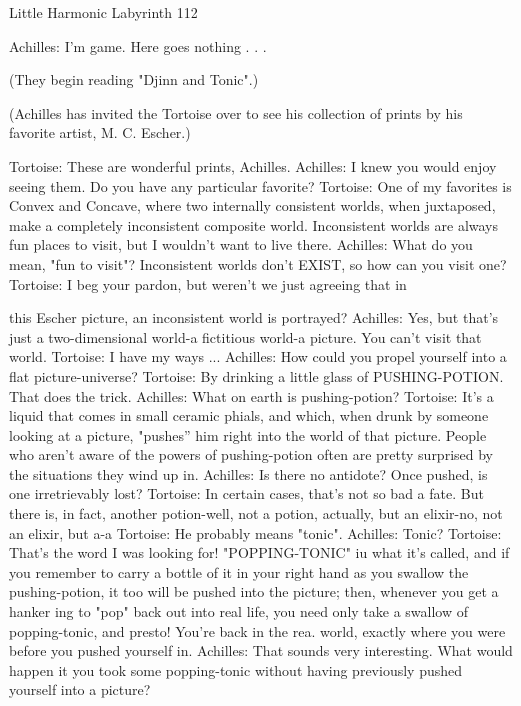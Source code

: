 Little Harmonic Labyrinth                                                               112

Achilles: I’m game. Here goes nothing . . .

       (They begin reading "Djinn and Tonic".)

                 (Achilles has invited the Tortoise over to see his collection of prints by
                 his favorite artist, M. C. Escher.)

           Tortoise: These are wonderful prints, Achilles.
           Achilles: I knew you would enjoy seeing them. Do you have any particular
                  favorite?
           Tortoise: One of my favorites is Convex and Concave, where two internally
                  consistent worlds, when juxtaposed, make a completely inconsistent
                  composite world. Inconsistent worlds are always fun places to visit,
                  but I wouldn't want to live there.
           Achilles: What do you mean, "fun to visit"? Inconsistent worlds don't EXIST,
                  so how can you visit one?
           Tortoise: I beg your pardon, but weren't we just agreeing that in

           this Escher picture, an inconsistent world is portrayed?
           Achilles: Yes, but that's just a two-dimensional world-a fictitious world-a
                   picture. You can't visit that world.
           Tortoise: I have my ways ...
           Achilles: How could you propel yourself into a flat picture-universe?
           Tortoise: By drinking a little glass of PUSHING-POTION. That does the
                   trick.
           Achilles: What on earth is pushing-potion?
           Tortoise: It's a liquid that comes in small ceramic phials, and which, when
                   drunk by someone looking at a picture, "pushes'' him right into the
                   world of that picture. People who aren't aware of the powers of
                   pushing-potion often are pretty surprised by the situations they wind
                   up in.
           Achilles: Is there no antidote? Once pushed, is one irretrievably lost?
           Tortoise: In certain cases, that's not so bad a fate. But there is, in fact, another
                   potion-well, not a potion, actually, but an elixir-no, not an elixir, but
                   a-a
           Tortoise: He probably means "tonic".
           Achilles: Tonic?
           Tortoise: That's the word I was looking for! "POPPING-TONIC" iu what it's
                   called, and if you remember to carry a bottle of it in your right hand as
                   you swallow the pushing-potion, it too will be pushed into the picture;
                   then, whenever you get a hanker ing to "pop" back out into real life,
                   you need only take a swallow of popping-tonic, and presto! You're
                   back in the rea. world, exactly where you were before you pushed
                   yourself in.
           Achilles: That sounds very interesting. What would happen it you took some
                   popping-tonic without having previously pushed yourself into a
                   picture?


